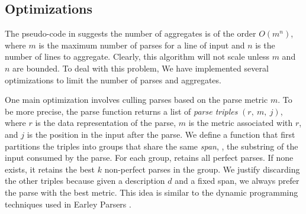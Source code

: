 
\subsection{Optimizations}
The pseudo-code in  suggests the number of
aggregates is of the order $O(m ^ n)$, where $m$ is the maximum number of
parses for a line of input  and $n$ is the number of lines to
aggregate.  Clearly, this algorithm will not scale 
unless $m$ and $n$ are bounded.  To deal with this problem,
We have implemented several optimizations to limit the number of 
parses and aggregates. 

One main optimization involves culling parses based on 
the parse metric $m$. 
To be more precise, the parse function returns a list of
{\em parse triples} $(r,~m,~j)$, where $r$ is the data representation of
the parse, $m$ is the metric associated with $r$, and
$j$ is the position in the input after the parse.
We define a  function that first partitions the
triples into groups that share the same 
{\em span}, \ie{}, the substring of the input consumed by the parse.
For each group,  retains all perfect parses. If 
none exists, it retains the best $k$ non-perfect parses in the group. 
We justify discarding the other triples because
given a description $d$ and a fixed span, we always
prefer the parse with the best metric. This idea is
similar to the dynamic programming techniques used in 
Earley Parsers \cite{earley-parser}. 

